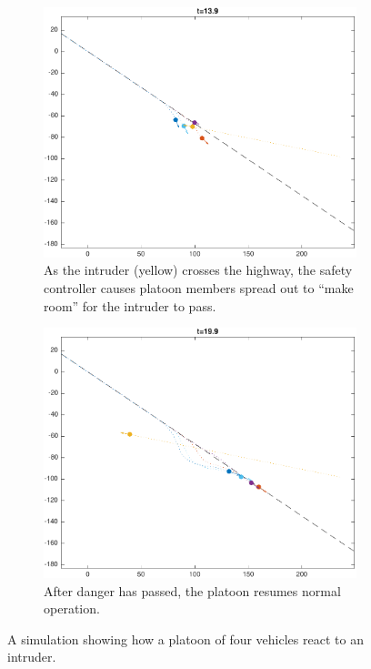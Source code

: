 \begin{figure}
    \begin{subfigure}[t]{0.45\textwidth} \label{subfig:in_140}
        \includegraphics[width=\textwidth]{fig/in_140}
        \caption{As the intruder (yellow) crosses the highway, the safety controller causes platoon members spread out to ``make room'' for the intruder to pass.}
    \end{subfigure}
    \begin{subfigure}[t]{0.45\textwidth} \label{subfig:in_200}
        \includegraphics[width=\textwidth]{fig/in_200}
        \caption{After danger has passed, the platoon resumes normal operation.}
    \end{subfigure}   
    \caption{A simulation showing how a platoon of four vehicles react to an intruder. \label{fig:in}}
\end{figure}

